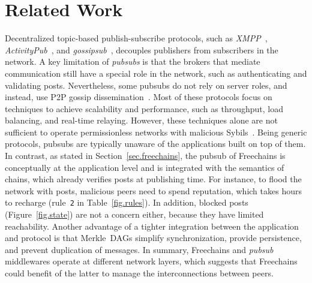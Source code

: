 \documentclass[12pt]{article}
\newcommand{\FC}       {Freechains\xspace}
\newcommand{\code}[1]  {\texttt{\footnotesize{#1}}}
\begin{document}
\section{Related Work}
\label{sec.related}



Decentralized topic-based publish-subscribe protocols, such as
    \emph{XMPP}~\cite{pubsub.xmpp},
    \emph{ActivityPub}~\cite{pubsub.activitypub}, and
    \emph{gossipsub}~\cite{pubsub.gossipsub},
decouples publishers from subscribers in the network.
%
A key limitation of \emph{pubsubs} is that the brokers that mediate
communication still have a special role in the network, such as authenticating
and validating posts.
%
Nevertheless, some pubsubs do not rely on server roles, and instead, use
P2P gossip dissemination~\cite{pubsub.tera,pubsub.rappel,pubsub.gossipsub}.
Most of these protocols focus on techniques to achieve scalability and
performance, such as throughput, load balancing, and real-time relaying.
%
However, these techniques alone are not sufficient to operate permissionless
networks with malicious Sybils~\cite{pubsub.gossipsub2}.
Being generic protocols, pubsubs are typically unaware of the applications
built on top of them.
%
In contrast, as stated in Section~\ref{sec.freechains}, the pubsub of \FC is
conceptually at the application level and is integrated with the semantics of
chains, which already verifies posts at publishing time.
For instance, to flood the network with posts, malicious peers need to spend
reputation, which takes hours to recharge (rule~\code{2} in
Table~\ref{fig.rules}).
In addition, blocked posts (Figure~\ref{fig.state}) are not a concern either,
because they have limited reachability.
Another advantage of a tighter integration between the application and protocol
is that Merkle~DAGs simplify synchronization, provide persistence, and prevent
duplication of messages.
%
In summary, \FC and \emph{pubsub} middlewares operate at different network
layers, which suggests that \FC could benefit of the latter to manage the
interconnections between peers.

\end{document}
